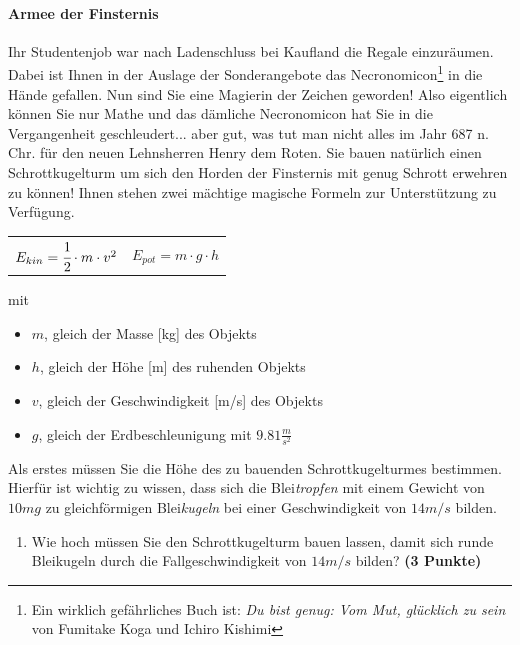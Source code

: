 \documentclass[a4paper, 9pt]{scrartcl}\usepackage[]{graphicx}\usepackage[]{xcolor}
\begin{document}
\paragraph{Armee der Finsternis}



Ihr Studentenjob war nach Ladenschluss bei Kaufland die Regale
einzur{\"a}umen. Dabei ist Ihnen in der Auslage der Sonderangebote das
Necronomicon\footnote{Ein wirklich gef{\"a}hrliches Buch ist:
  \textit{Du bist genug: Vom Mut, gl{\"u}cklich zu sein} von Fumitake Koga und
  Ichiro Kishimi} in die H{\"a}nde gefallen. Nun sind Sie eine Magierin der
Zeichen geworden! Also eigentlich k{\"o}nnen Sie nur Mathe und das d{\"a}mliche
Necronomicon hat Sie in die Vergangenheit geschleudert... aber gut, was tut
man nicht alles im Jahr 687 n. Chr. f{\"u}r den neuen Lehnsherren
Henry dem Roten. Sie bauen nat{\"u}rlich einen Schrottkugelturm um sich den
Horden der Finsternis mit genug Schrott erwehren zu k{\"o}nnen! Ihnen stehen
zwei m{\"a}chtige magische Formeln zur Unterst{\"u}tzung zu Verf{\"u}gung.

\begin{center}
  \begin{tabular}{cc}
    $E_{kin} = \cfrac{1}{2}\cdot m \cdot v^2$ & $E_{pot} = m \cdot g \cdot h$\\
  \end{tabular}
\end{center}

mit

\begin{itemize}
\item $m$, gleich der Masse [kg] des Objekts
\item $h$, gleich der H{\"o}he [m] des ruhenden Objekts
\item $v$, gleich der Geschwindigkeit [m/s] des Objekts
\item $g$, gleich der Erdbeschleunigung mit $9.81 \tfrac{m}{s^2}$ 
\end{itemize}

Als erstes m{\"u}ssen Sie die H{\"o}he des zu bauenden Schrottkugelturmes
bestimmen. Hierf{\"u}r ist wichtig zu wissen, dass sich die
Blei\textit{tropfen} mit einem Gewicht von $10mg$ zu
gleichf{\"o}rmigen Blei\textit{kugeln} bei einer Geschwindigkeit von
$14m/s$ bilden.

\begin{enumerate}
\item Wie hoch m{\"u}ssen Sie den Schrottkugelturm bauen lassen, damit sich
  runde Bleikugeln durch die Fallgeschwindigkeit von $14m/s$ bilden?
  \textbf{(3 Punkte)}
\end{enumerate}
\end{document}
